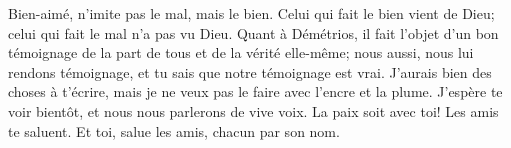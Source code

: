 Bien-aimé, n’imite pas le mal, mais le bien.
Celui qui fait le bien vient de Dieu;
	celui qui fait le mal n’a pas vu Dieu.
Quant à Démétrios, il fait l’objet d’un bon témoignage de la part de tous
		et de la vérité elle-même;
	nous aussi, nous lui rendons témoignage, et tu sais que notre témoignage est vrai.
J’aurais bien des choses à t’écrire,
	mais je ne veux pas le faire avec l’encre et la plume.
J’espère te voir bientôt, et nous nous parlerons de vive voix.
La paix soit avec toi! Les amis te saluent.
	Et toi, salue les amis, chacun par son nom.
